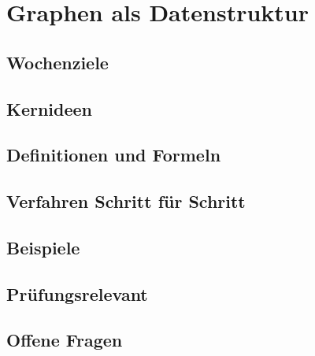 \chapter{Graphen als Datenstruktur}
\label{kap:11-graphen}

\section*{Wochenziele}
\begin{wochenziele}
\end{wochenziele}

\section{Kernideen}

\section{Definitionen und Formeln}

\section{Verfahren Schritt für Schritt}

\section{Beispiele}

\section{Prüfungsrelevant}

\section{Offene Fragen}
